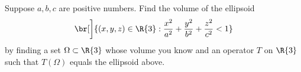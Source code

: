 \exercise
Suppose $a, b, c$ are positive numbers.  Find the volume of the ellipsoid
\[
\br[\bigg]{ (x, y, z) \in \R{3}: \frac{x^2}{a^2} + \frac{y^2}{b^2} + \frac{z^2}{c^2} < 1 }
\]
by finding a set $\Omega \subset \R{3}$ whose volume you know and an operator
$T$ on $\R{3}$ such that $T(\Omega)$ equals the ellipsoid above.

